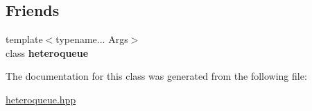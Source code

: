 \subsection*{Friends}
\begin{DoxyCompactItemize}
\item 
\hypertarget{classheterogeneous_1_1heteroqueue_3_01_t_00_01_types_8_8_8_4_a3386563cc166ee8d0bdf9b1a4cf3fe63}{}{\footnotesize template$<$typename... Args$>$ }\\class {\bfseries heteroqueue}\label{classheterogeneous_1_1heteroqueue_3_01_t_00_01_types_8_8_8_4_a3386563cc166ee8d0bdf9b1a4cf3fe63}

\end{DoxyCompactItemize}


The documentation for this class was generated from the following file\+:\begin{DoxyCompactItemize}
\item 
\hyperlink{heteroqueue_8hpp}{heteroqueue.\+hpp}\end{DoxyCompactItemize}
